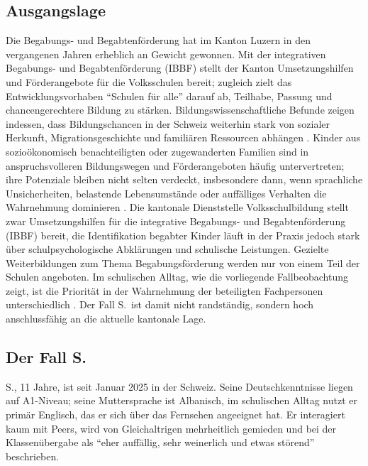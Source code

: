 \documentclass[ngerman, a4paper]{article}
\begin{document}
\subsection*{Ausgangslage}
 
Die Begabungs- und Begabtenförderung hat im Kanton Luzern in den vergangenen Jahren
erheblich an Gewicht gewonnen. Mit der integrativen Begabungs- und Begabtenförderung
(IBBF) stellt der Kanton Umsetzungshilfen und Förderangebote für die Volksschulen bereit;
zugleich zielt das Entwicklungsvorhaben \enquote{Schulen für alle} darauf ab, Teilhabe, Passung
und chancengerechtere Bildung zu stärken. Bildungswissenschaftliche Befunde zeigen
indessen, dass Bildungschancen in der Schweiz weiterhin stark von sozialer Herkunft,
Migrationsgeschichte und familiären Ressourcen abhängen
\parencites[S.\,45--48]{erzinger2023pisa}[S.\,576--585]{stamm2021fehlenderblick}[S.\,34,\,37]{bfs2022migration}.
Kinder aus sozioökonomisch benachteiligten oder zugewanderten Familien sind in
anspruchsvolleren Bildungswegen und Förderangeboten häufig untervertreten; ihre Potenziale
bleiben nicht selten verdeckt, insbesondere dann, wenn sprachliche Unsicherheiten, belastende
Lebensumstände oder auffälliges Verhalten die Wahrnehmung dominieren
\parencites[S.\,76--78]{kellerkoller2021hellekoepfe}[S.\,6--8]{leikhof2021jugendliche}.
Die kantonale Dienststelle Volksschulbildung stellt zwar Umsetzungshilfen für die
integrative Begabungs- und Begabtenförderung (IBBF) bereit, die Identifikation
begabter Kinder läuft in der Praxis jedoch stark über schulpsychologische
Abklärungen und schulische Leistungen. Gezielte Weiterbildungen zum Thema
Begabungsförderung werden nur von einem Teil der Schulen angeboten. Im
schulischen Alltag, wie die vorliegende Fallbeobachtung zeigt, ist die
Priorität in der Wahrnehmung der beteiligten Fachpersonen unterschiedlich
\parencite{dvs2025bbf}. Der Fall S.\ ist damit nicht randständig, sondern
hoch anschlussfähig an die aktuelle kantonale Lage.
 
\subsection*{Der Fall S.}
 
S., 11 Jahre, ist seit Januar 2025 in der Schweiz. Seine Deutschkenntnisse liegen auf
A1-Niveau; seine Muttersprache ist Albanisch, im schulischen Alltag nutzt er primär
Englisch, das er sich über das Fernsehen angeeignet hat. Er interagiert kaum mit Peers,
wird von Gleichaltrigen mehrheitlich gemieden und bei der Klassenübergabe als
\enquote{eher auffällig, sehr weinerlich und etwas störend} beschrieben.
 
\end{document}
